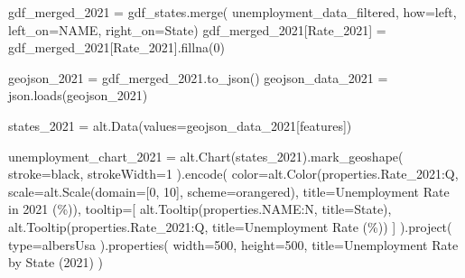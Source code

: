\documentclass[
  letterpaper,
  DIV=11,
  numbers=noendperiod]{scrartcl}
\newenvironment{Shaded}{\begin{snugshade}}{\end{snugshade}}
\newcommand{\BuiltInTok}[1]{\textcolor[rgb]{0.00,0.23,0.31}{#1}}
\newcommand{\DecValTok}[1]{\textcolor[rgb]{0.68,0.00,0.00}{#1}}
\newcommand{\NormalTok}[1]{\textcolor[rgb]{0.00,0.23,0.31}{#1}}
\newcommand{\OperatorTok}[1]{\textcolor[rgb]{0.37,0.37,0.37}{#1}}
\newcommand{\StringTok}[1]{\textcolor[rgb]{0.13,0.47,0.30}{#1}}
\begin{document}
\begin{Shaded}
\begin{Highlighting}[]
\NormalTok{gdf\_merged\_2021 }\OperatorTok{=}\NormalTok{ gdf\_states.merge(}
\NormalTok{    unemployment\_data\_filtered, how}\OperatorTok{=}\StringTok{\textquotesingle{}left\textquotesingle{}}\NormalTok{, left\_on}\OperatorTok{=}\StringTok{\textquotesingle{}NAME\textquotesingle{}}\NormalTok{, right\_on}\OperatorTok{=}\StringTok{\textquotesingle{}State\textquotesingle{}}\NormalTok{)}
\NormalTok{gdf\_merged\_2021[}\StringTok{\textquotesingle{}Rate\_2021\textquotesingle{}}\NormalTok{] }\OperatorTok{=}\NormalTok{ gdf\_merged\_2021[}\StringTok{\textquotesingle{}Rate\_2021\textquotesingle{}}\NormalTok{].fillna(}\DecValTok{0}\NormalTok{)}

\NormalTok{geojson\_2021 }\OperatorTok{=}\NormalTok{ gdf\_merged\_2021.to\_json()}
\NormalTok{geojson\_data\_2021 }\OperatorTok{=}\NormalTok{ json.loads(geojson\_2021)}

\NormalTok{states\_2021 }\OperatorTok{=}\NormalTok{ alt.Data(values}\OperatorTok{=}\NormalTok{geojson\_data\_2021[}\StringTok{\textquotesingle{}features\textquotesingle{}}\NormalTok{])}

\NormalTok{unemployment\_chart\_2021 }\OperatorTok{=}\NormalTok{ alt.Chart(states\_2021).mark\_geoshape(}
\NormalTok{    stroke}\OperatorTok{=}\StringTok{\textquotesingle{}black\textquotesingle{}}\NormalTok{,}
\NormalTok{    strokeWidth}\OperatorTok{=}\DecValTok{1}
\NormalTok{).encode(}
\NormalTok{    color}\OperatorTok{=}\NormalTok{alt.Color(}\StringTok{\textquotesingle{}properties.Rate\_2021:Q\textquotesingle{}}\NormalTok{,}
\NormalTok{                    scale}\OperatorTok{=}\NormalTok{alt.Scale(domain}\OperatorTok{=}\NormalTok{[}\DecValTok{0}\NormalTok{, }\DecValTok{10}\NormalTok{], scheme}\OperatorTok{=}\StringTok{\textquotesingle{}orangered\textquotesingle{}}\NormalTok{),}
\NormalTok{                    title}\OperatorTok{=}\StringTok{\textquotesingle{}Unemployment Rate in 2021 (\%)\textquotesingle{}}\NormalTok{),}
\NormalTok{    tooltip}\OperatorTok{=}\NormalTok{[}
\NormalTok{        alt.Tooltip(}\StringTok{\textquotesingle{}properties.NAME:N\textquotesingle{}}\NormalTok{, title}\OperatorTok{=}\StringTok{\textquotesingle{}State\textquotesingle{}}\NormalTok{),}
\NormalTok{        alt.Tooltip(}\StringTok{\textquotesingle{}properties.Rate\_2021:Q\textquotesingle{}}\NormalTok{, title}\OperatorTok{=}\StringTok{\textquotesingle{}Unemployment Rate (\%)\textquotesingle{}}\NormalTok{)}
\NormalTok{    ]}
\NormalTok{).project(}
    \BuiltInTok{type}\OperatorTok{=}\StringTok{\textquotesingle{}albersUsa\textquotesingle{}}
\NormalTok{).properties(}
\NormalTok{    width}\OperatorTok{=}\DecValTok{500}\NormalTok{,}
\NormalTok{    height}\OperatorTok{=}\DecValTok{500}\NormalTok{,}
\NormalTok{    title}\OperatorTok{=}\StringTok{\textquotesingle{}Unemployment Rate by State (2021)\textquotesingle{}}
\NormalTok{)}


\end{Highlighting}
\end{Shaded}
\end{document}
